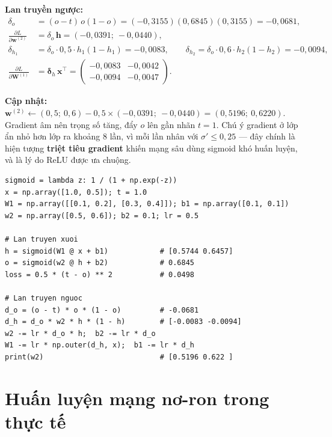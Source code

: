 \noindent\textbf{Lan truyền ngược:}
\begin{align*}
    \delta_o &= (o - t)\,o(1 - o) = (-0{,}3155)(0{,}6845)(0{,}3155) = -0{,}0681, \\
    \frac{\partial L}{\partial \mathbf{w}^{(2)}} &= \delta_o\,\mathbf{h} = (-0{,}0391;\ -0{,}0440), \\
    \delta_{h_1} &= \delta_o \cdot 0{,}5 \cdot h_1(1 - h_1) = -0{,}0083, \qquad
    \delta_{h_2} = \delta_o \cdot 0{,}6 \cdot h_2(1 - h_2) = -0{,}0094, \\
    \frac{\partial L}{\partial \mathbf{W}^{(1)}} &= \boldsymbol{\delta}_h\,\mathbf{x}^{\top} = \begin{pmatrix} -0{,}0083 & -0{,}0042 \\ -0{,}0094 & -0{,}0047 \end{pmatrix}.
\end{align*}

\noindent\textbf{Cập nhật:} $\mathbf{w}^{(2)} \leftarrow (0{,}5;\ 0{,}6) - 0{,}5 \times (-0{,}0391;\ -0{,}0440) = (0{,}5196;\ 0{,}6220)$. Gradient âm nên trọng số tăng, đẩy $o$ lên gần nhãn $t = 1$. Chú ý gradient ở lớp ẩn nhỏ hơn lớp ra khoảng 8 lần, vì mỗi lần nhân với $\sigma' \leq 0{,}25$ --- đây chính là hiện tượng \textbf{triệt tiêu gradient} khiến mạng sâu dùng sigmoid khó huấn luyện, và là lý do ReLU được ưa chuộng.

\begin{lstlisting}[caption={Kiểm tra ví dụ lan truyền ngược bằng NumPy}]
sigmoid = lambda z: 1 / (1 + np.exp(-z))
x = np.array([1.0, 0.5]); t = 1.0
W1 = np.array([[0.1, 0.2], [0.3, 0.4]]); b1 = np.array([0.1, 0.1])
w2 = np.array([0.5, 0.6]); b2 = 0.1; lr = 0.5

# Lan truyen xuoi
h = sigmoid(W1 @ x + b1)            # [0.5744 0.6457]
o = sigmoid(w2 @ h + b2)            # 0.6845
loss = 0.5 * (t - o) ** 2           # 0.0498

# Lan truyen nguoc
d_o = (o - t) * o * (1 - o)         # -0.0681
d_h = d_o * w2 * h * (1 - h)        # [-0.0083 -0.0094]
w2 -= lr * d_o * h;  b2 -= lr * d_o
W1 -= lr * np.outer(d_h, x);  b1 -= lr * d_h
print(w2)                           # [0.5196 0.622 ]
\end{lstlisting}

\section{Huấn luyện mạng nơ-ron trong thực tế}

